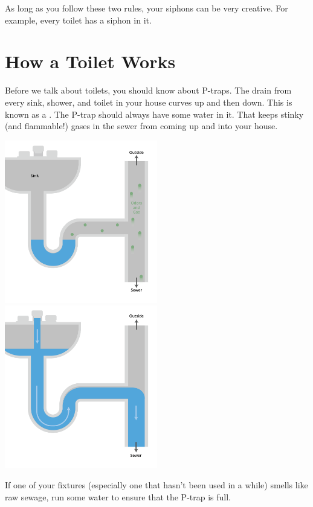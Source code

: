 As long as you follow these two rules,  your siphons can be very creative.  For example,  every toilet has a siphon in it.

\section{How a Toilet Works}

Before we talk about toilets,  you should know about P-traps.  The drain from every sink, shower, 
and toilet in your house curves up and then down.  This is known as a .   
The P-trap should always have some water in it. That keeps stinky (and flammable!) gases 
in the sewer from coming up and into your house.  

\includegraphics[width=0.5\textwidth]{ptrap1.png}
\includegraphics[width=0.5\textwidth]{ptrap2.png}


If one of your fixtures (especially one that hasn't been used in a while) smells like raw sewage,  run
some water to ensure that the P-trap is full.

